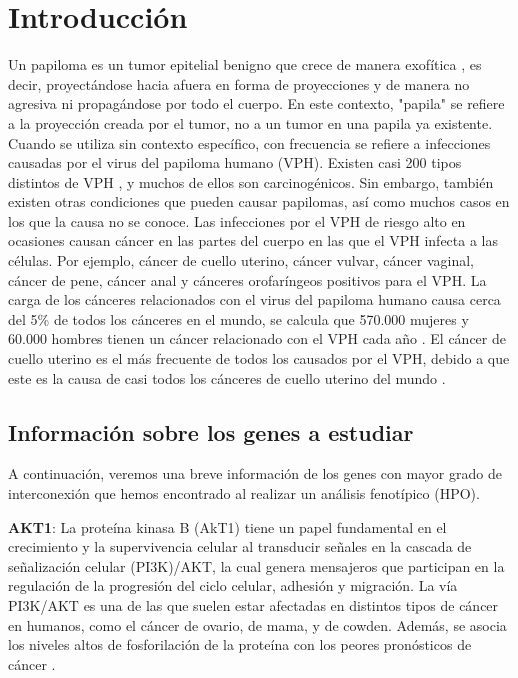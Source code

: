 \section{Introducción}
Un papiloma es un tumor epitelial benigno que crece de manera exofítica \cite{Kozomara2007}, es decir, proyectándose hacia afuera en forma de proyecciones y de manera no agresiva ni propagándose por todo el cuerpo. En este contexto, "papila" se refiere a la proyección creada por el tumor, no a un tumor en una papila ya existente.
Cuando se utiliza sin contexto específico, con frecuencia se refiere a infecciones causadas por el virus del papiloma humano (VPH). Existen casi 200 tipos distintos de VPH \cite{Ljubojevic2014}, y muchos de ellos son carcinogénicos. Sin embargo, también existen otras condiciones que pueden causar papilomas, así como muchos casos en los que la causa no se conoce.
Las infecciones por el VPH de riesgo alto en ocasiones causan cáncer en las partes del cuerpo en las que el VPH infecta a las células. Por ejemplo, cáncer de cuello uterino, cáncer vulvar, cáncer vaginal, cáncer de pene, cáncer anal y cánceres orofaríngeos positivos para el VPH. La carga de los cánceres relacionados con el virus del papiloma humano causa cerca del 5\% \cite{papiloma} de todos los cánceres en el mundo, se calcula que 570.000 mujeres y 60.000 hombres tienen un cáncer relacionado con el VPH cada año \cite{papiloma} . El cáncer de cuello uterino es el más frecuente de todos los causados por el VPH, debido a que este es la causa de casi todos los cánceres de cuello uterino del mundo \cite{papiloma}.

\vspace{5pt}

\subsection{Información sobre los genes a estudiar} 
A continuación, veremos una breve información de los genes con mayor grado de interconexión que hemos encontrado al realizar un análisis fenotípico (HPO).

\vspace{3pt}

\textbf{AKT1}: La proteína kinasa B (AkT1) tiene un papel fundamental en el crecimiento y la supervivencia celular al transducir señales en la cascada de señalización celular (PI3K)/AKT, la cual genera mensajeros que participan en la regulación de la progresión del ciclo celular, adhesión y migración. La vía  PI3K/AKT es una de las que suelen estar afectadas en distintos tipos de cáncer en humanos, como el cáncer de ovario, de mama, y de cowden. Además, se asocia los niveles altos de fosforilación de la proteína con los peores pronósticos de cáncer \cite{Siegel2012}.

